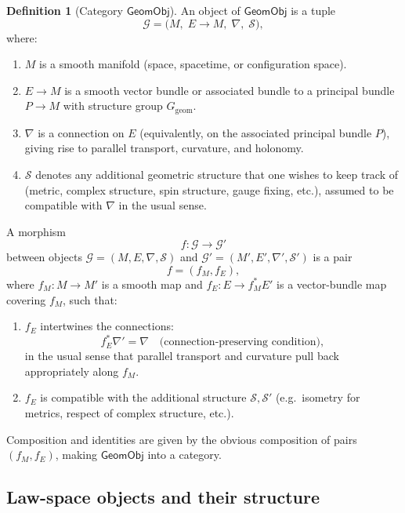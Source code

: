 \documentclass[11pt]{book}
\theoremstyle{plain}
\theoremstyle{definition}
\newtheorem{definition}[theorem]{Definition} \theoremstyle{remark}
\begin{document}
\begin{definition}[Category \(\mathsf{GeomObj}\)]
An object of \(\mathsf{GeomObj}\) is a tuple
\[
  \mathcal{G}
  =
  \bigl(M,\;E\to M,\;\nabla,\;\mathcal{S}\bigr),
\]
where:
\begin{enumerate}
  \item \(M\) is a smooth manifold (space, spacetime, or configuration
        space).
  \item \(E\to M\) is a smooth vector bundle or associated bundle to a
        principal bundle \(P\to M\) with structure group
        \(G_{\mathrm{geom}}\).
  \item \(\nabla\) is a connection on \(E\) (equivalently, on the
        associated principal bundle \(P\)), giving rise to parallel
        transport, curvature, and holonomy.
  \item \(\mathcal{S}\) denotes any additional geometric structure
        that one wishes to keep track of (metric, complex structure,
        spin structure, gauge fixing, etc.), assumed to be compatible
        with \(\nabla\) in the usual sense.
\end{enumerate}
A morphism
\[
  f:\mathcal{G}\longrightarrow\mathcal{G}'
\]
between objects
\(\mathcal{G}=(M,E,\nabla,\mathcal{S})\) and
\(\mathcal{G}'=(M',E',\nabla',\mathcal{S}')\) is a pair
\[
  f=(f_M,f_E),
\]
where \(f_M:M\to M'\) is a smooth map and
\(f_E:E\to f_M^*E'\) is a vector-bundle map covering \(f_M\), such
that:
\begin{enumerate}
  \item[(i)] \(f_E\) intertwines the connections:
    \[
      f_E^*\nabla' = \nabla
      \quad\text{(connection-preserving condition)},
    \]
    in the usual sense that parallel transport and curvature pull back
    appropriately along \(f_M\).
  \item[(ii)] \(f_E\) is compatible with the additional structure
    \(\mathcal{S},\mathcal{S}'\) (e.g.\ isometry for metrics, respect
    of complex structure, etc.).
\end{enumerate}
Composition and identities are given by the obvious composition of
pairs \((f_M,f_E)\), making \(\mathsf{GeomObj}\) into a category.
\end{definition}



\subsection*{Law-space objects and their structure}
\end{document}
